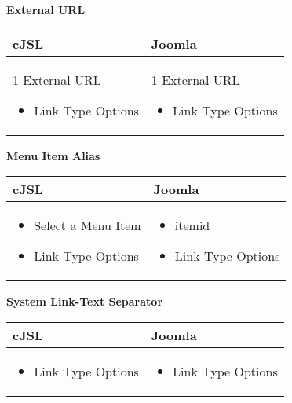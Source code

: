 \textbf{External URL}

\begin{minipage}{0.7\textwidth}
\begin{tabular}{|p{} | p{}|}
\hline
\textbf{cJSL} & \textbf{Joomla} \\ 
\hline
1-External URL
 \begin{itemize}
 \item Link Type Options
 \end{itemize}
 & 
1-External URL
\begin{itemize}
 \item Link Type Options
 \end{itemize}
\\
\hline
\end{tabular}
\end{minipage}

\textbf{Menu Item Alias}

\begin{minipage}{0.7\textwidth}
\begin{tabular}{|p{} | p{}|}
\hline
\textbf{cJSL} & \textbf{Joomla} \\ 
\hline

 \begin{itemize}
 \item Select a Menu Item
 \item Link Type Options
 \end{itemize}
 & 

\begin{itemize}
\item itemid
 \item Link Type Options
 \end{itemize}
\\
\hline
\end{tabular}
\end{minipage}

\textbf{System Link-Text Separator}

\begin{minipage}{0.7\textwidth}
\begin{tabular}{|p{} | p{}|}
\hline
\textbf{cJSL} & \textbf{Joomla} \\ 
\hline

 \begin{itemize}
 \item Link Type Options
 \end{itemize}
 & 

\begin{itemize}
 \item Link Type Options
 \end{itemize}
\\
\hline
\end{tabular}
\end{minipage}

